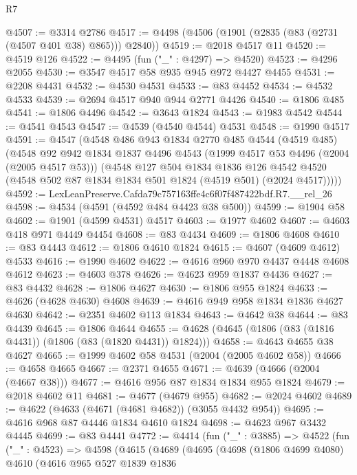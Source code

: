 \begin{lexlean}{R7}
\begin{coremodule}
@4507 := @3314 @2786
@4517 := @4498 (@4506 (@1901 (@2835 (@83 (@2731 (@4507 @401 @38) @865))) @2840))
@4519 := @2018 @4517 @11
@4520 := @4519 @126
@4522 := @4495 (fun ("_" : @4297) => @4520)
@4523 := @4296 @2055
@4530 := @3547 @4517 @58 @935 @945 @972 @4427 @4455
@4531 := @2208 @4431
@4532 := @4530 @4531
@4533 := @83 @4452
@4534 := @4532 @4533
@4539 := @2694 @4517 @940 @944 @2771 @4426
@4540 := @1806 @485
@4541 := @1806 @4496
@4542 := @3643 @1824
@4543 := @1983 @4542
@4544 := @4541 @4543
@4547 := @4539 (@4540 @4544) @4531
@4548 := @1990 @4517
@4591 := @4547
    (@4548
      @486
      @943
      @1834
      @2770
      @485
      @4544
      (@4519 @485)
      (@4548
        @92
        @942
        @1834
        @1837
        @4496
        @4543
        (@1999 @4517 @53 @4496 (@2004 (@2005 @4517 @53)))
        (@4548
          @127
          @504
          @1834
          @1836
          @126
          @4542
          @4520
          (@4548 @502 @87 @1834 @1834 @501 @1824 (@4519 @501) (@2024 @4517)))))
@4592 := LexLeanPreserve.Cafda79c757163ffe4c6f07f487422bdf.R7.__rel_26
@4598 := @4534 (@4591 (@4592 @484 @4423 @38 @500))
@4599 := @1904 @58
@4602 := @1901 (@4599 @4531) @4517
@4603 := @1977 @4602
@4607 := @4603 @418 @971 @4449 @4454
@4608 := @83 @4434
@4609 := @1806 @4608
@4610 := @83 @4443
@4612 := @1806 @4610 @1824
@4615 := @4607 (@4609 @4612) @4533
@4616 := @1990 @4602
@4622 := @4616 @960 @970 @4437 @4448 @4608 @4612
@4623 := @4603 @378
@4626 := @4623 @959 @1837 @4436
@4627 := @83 @4432
@4628 := @1806 @4627
@4630 := @1806 @955 @1824
@4633 := @4626 (@4628 @4630) @4608
@4639 := @4616 @949 @958 @1834 @1836 @4627 @4630
@4642 := @2351 @4602 @113 @1834
@4643 := @4642 @38
@4644 := @83 @4439
@4645 := @1806 @4644
@4655 := @4628 (@4645 (@1806 (@83 (@1816 @4431)) (@1806 (@83 (@1820 @4431)) @1824)))
@4658 := @4643 @4655 @38 @4627
@4665 := @1999 @4602 @58 @4531 (@2004 (@2005 @4602 @58))
@4666 := @4658 @4665
@4667 := @2371 @4655
@4671 := @4639 (@4666 (@2004 (@4667 @38)))
@4677 := @4616 @956 @87 @1834 @1834 @955 @1824
@4679 := @2018 @4602 @11
@4681 := @4677 (@4679 @955)
@4682 := @2024 @4602
@4689 := @4622 (@4633 (@4671 (@4681 @4682)) (@3055 @4432 @954))
@4695 := @4616 @968 @87 @4446 @1834 @4610 @1824
@4698 := @4623 @967 @3432 @4445
@4699 := @83 @4441
@4772 := @4414
    (fun ("_" : @3885) =>
    @4522
      (fun ("_" : @4523) =>
      @4598
        (@4615
          (@4689
            (@4695
              (@4698
                (@1806 @4699 @4080)
                @4610
                (@4616
                  @965
                  @527
                  @1839
                  @1836

\end{coremodule}
\end{lexlean}
